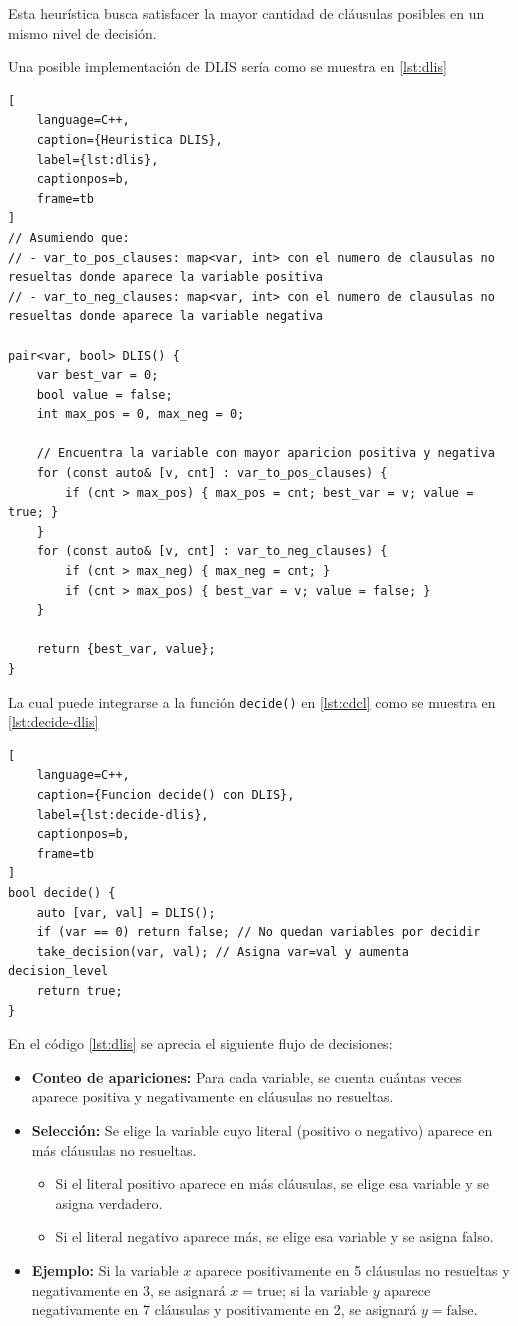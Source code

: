 Esta heur\'istica busca satisfacer la mayor cantidad de cl\'ausulas posibles en un mismo nivel de decisi\'on.

Una posible implementaci\'on de DLIS ser\'ia como se muestra en \ref{lst:dlis}

\begin{lstlisting}[
    language=C++,
    caption={Heuristica DLIS},
    label={lst:dlis},
    captionpos=b,
    frame=tb
]
// Asumiendo que:
// - var_to_pos_clauses: map<var, int> con el numero de clausulas no resueltas donde aparece la variable positiva
// - var_to_neg_clauses: map<var, int> con el numero de clausulas no resueltas donde aparece la variable negativa

pair<var, bool> DLIS() {
    var best_var = 0;
    bool value = false;
    int max_pos = 0, max_neg = 0;

    // Encuentra la variable con mayor aparicion positiva y negativa
    for (const auto& [v, cnt] : var_to_pos_clauses) {
        if (cnt > max_pos) { max_pos = cnt; best_var = v; value = true; }
    }
    for (const auto& [v, cnt] : var_to_neg_clauses) {
        if (cnt > max_neg) { max_neg = cnt; }
        if (cnt > max_pos) { best_var = v; value = false; }
    }

    return {best_var, value};
}
\end{lstlisting}

La cual puede integrarse a la funci\'on \texttt{decide()} en \ref{lst:cdcl} como se muestra en \ref{lst:decide-dlis}

\begin{lstlisting}[
    language=C++,
    caption={Funcion decide() con DLIS},
    label={lst:decide-dlis},
    captionpos=b,
    frame=tb
]
bool decide() {
    auto [var, val] = DLIS();
    if (var == 0) return false; // No quedan variables por decidir
    take_decision(var, val); // Asigna var=val y aumenta decision_level
    return true;
}
\end{lstlisting}

En el c\'odigo \ref{lst:dlis} se aprecia el siguiente flujo de decisiones:

\begin{itemize}
    \item \textbf{Conteo de apariciones:} Para cada variable, se cuenta cuántas veces aparece positiva y negativamente en cláusulas no resueltas.
    \item \textbf{Selección:} Se elige la variable cuyo literal (positivo o negativo) aparece en más cláusulas no resueltas.
    \begin{itemize}
        \item Si el literal positivo aparece en más cláusulas, se elige esa variable y se asigna verdadero.
        \item Si el literal negativo aparece más, se elige esa variable y se asigna falso.
    \end{itemize}
    \item \textbf{Ejemplo:} Si la variable $x$ aparece positivamente en 5 cláusulas no resueltas y negativamente en 3, se asignará $x = \mathrm{true}$; si la variable $y$ aparece negativamente en 7 cláusulas y positivamente en 2, se asignará $y = \mathrm{false}$.
\end{itemize}

